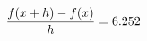 \documentclass[preview]{standalone}
\begin{document}
\begin{align*}
\special{dvisvgm:raw <g id='unique000'>}\frac{f(x+h)-f(x)}{h} = 6.252\special{dvisvgm:raw </g>}
\end{align*}
\end{document}
